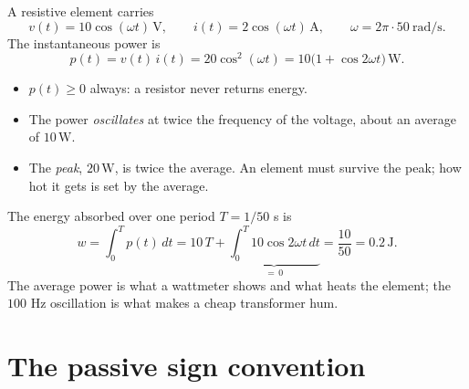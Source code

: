 \documentclass[11pt,a4paper]{article}
\newcommand{\Vcol}[1]{\textcolor{cvolt}{#1}}
\newcommand{\Pcol}[1]{\textcolor{cpow}{#1}}
\newcommand{\uni}[1]{\,\mathrm{#1}}
\newcommand{\A}{\uni{A}}   \newcommand{\V}{\uni{V}}
\newcommand{\W}{\uni{W}}   \newcommand{\J}{\uni{J}}
\begin{document}
\begin{examplebox}
A resistive element carries
\[
  v(t) = 10\cos(\omega t)\V, \qquad i(t) = 2\cos(\omega t)\A ,
  \qquad \omega = 2\pi \cdot 50\ \mathrm{rad/s}.
\]
The instantaneous power is
\[
  p(t) = v(t)\,i(t) = 20\cos^{2}(\omega t) = 10\bigl(1 + \cos 2\omega t\bigr)\W .
\]

\begin{center}
\begin{minipage}[c]{0.52\textwidth}
\centering
{}
\end{minipage}%
\begin{minipage}[c]{0.46\textwidth}
\small
\begin{itemize}[leftmargin=1.1em]
  \item $p(t) \ge 0$ always: a resistor never returns energy.
  \item The power \emph{oscillates} at twice the frequency of the voltage, about an average
        of $10\W$.
  \item The \emph{peak}, $20\W$, is twice the average. An element must survive the peak;
        how hot it gets is set by the average.
\end{itemize}
\end{minipage}
\end{center}

The energy absorbed over one period $T = 1/50$ s is
\[
  w = \int_{0}^{T} p(t)\,dt = 10\,T + \underbrace{\int_{0}^{T} 10\cos 2\omega t\,dt}_{=\,0}
    = \frac{10}{50} = 0.2\J .
\]
The average power is what a wattmeter shows and what heats the element; the $100$ Hz
oscillation is what makes a cheap transformer hum.
\end{examplebox}

\section{The passive sign convention}
\end{document}
